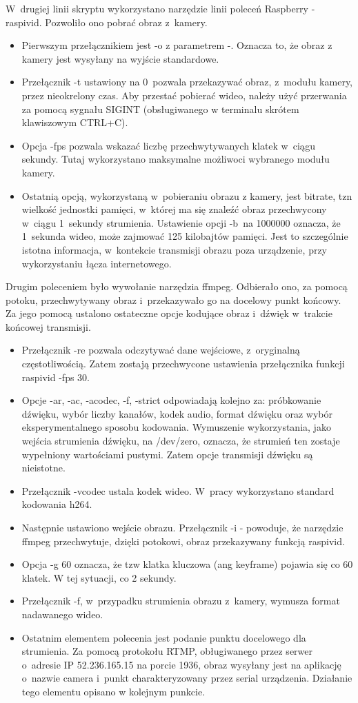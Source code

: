 W~drugiej linii skryptu wykorzystano narzędzie linii poleceń Raspberry - raspivid. Pozwoliło ono pobrać obraz z~kamery. 
\begin{itemize}
\item Pierwszym przełącznikiem jest -o z parametrem -. Oznacza to, że obraz z kamery jest wysyłany na wyjście standardowe.
\item Przełącznik -t ustawiony na 0~pozwala przekazywać obraz, z~modułu kamery, przez nieokrelony czas. Aby przestać pobierać wideo, należy użyć przerwania za pomocą sygnału SIGINT (obsługiwanego w terminalu skrótem klawiszowym CTRL+C).
\item Opcja -fps pozwala wskazać liczbę przechwytywanych klatek w~ciągu sekundy. Tutaj wykorzystano maksymalne możliwoci wybranego modułu kamery.
\item Ostatnią opcją, wykorzystaną w~pobieraniu obrazu z kamery, jest bitrate, tzn wielkość jednostki pamięci, w~której ma się znaleźć obraz przechwycony w~ciągu 1~sekundy strumienia. Ustawienie opcji -b~na 1000000 oznacza, że 1~sekunda wideo, może zajmować 125 kilobajtów pamięci. Jest to szczególnie istotna informacja, w~kontekcie transmisji obrazu poza urządzenie, przy wykorzystaniu łącza internetowego.
\end{itemize}

Drugim poleceniem było wywołanie narzędzia ffmpeg. Odbierało ono, za pomocą potoku, przechwytywany obraz i~przekazywało go na docelowy punkt końcowy. Za jego pomocą ustalono ostateczne opcje kodujące obraz i~dźwięk w~trakcie końcowej transmisji.
\begin{itemize}
\item Przełącznik -re pozwala odczytywać dane wejściowe, z~oryginalną częstotliwością. Zatem zostają przechwycone ustawienia przełącznika funkcji raspivid -fps 30.
\item Opcje  -ar, -ac, -acodec, -f, -strict odpowiadają kolejno za: próbkowanie dźwięku, wybór liczby kanałów, kodek audio, format dźwięku oraz wybór eksperymentalnego sposobu kodowania. Wymuszenie wykorzystania, jako wejścia strumienia dźwięku, na /dev/zero, oznacza, że strumień ten zostaje wypełniony wartościami pustymi. Zatem opcje transmisji dźwięku są nieistotne.
\item Przełącznik -vcodec ustala kodek wideo. W~pracy wykorzystano standard kodowania h264.
\item Następnie ustawiono wejście obrazu. Przełącznik -i - powoduje, że narzędzie ffmpeg przechwytuje, dzięki potokowi, obraz przekazywany funkcją raspivid.
\item Opcja -g 60 oznacza, że tzw klatka kluczowa (ang keyframe) pojawia się co 60 klatek. W tej sytuacji, co 2 sekundy. 
\item Przełącznik -f, w~przypadku strumienia obrazu z~kamery, wymusza format nadawanego wideo.  
\item Ostatnim elementem polecenia jest podanie punktu docelowego dla strumienia. Za pomocą protokołu RTMP, obługiwanego przez serwer o~adresie IP 52.236.165.15 na porcie 1936, obraz wysyłany jest na aplikację o~nazwie camera i~punkt charakteryzowany przez serial urządzenia. Działanie tego elementu opisano w kolejnym punkcie. 
\end{itemize}

